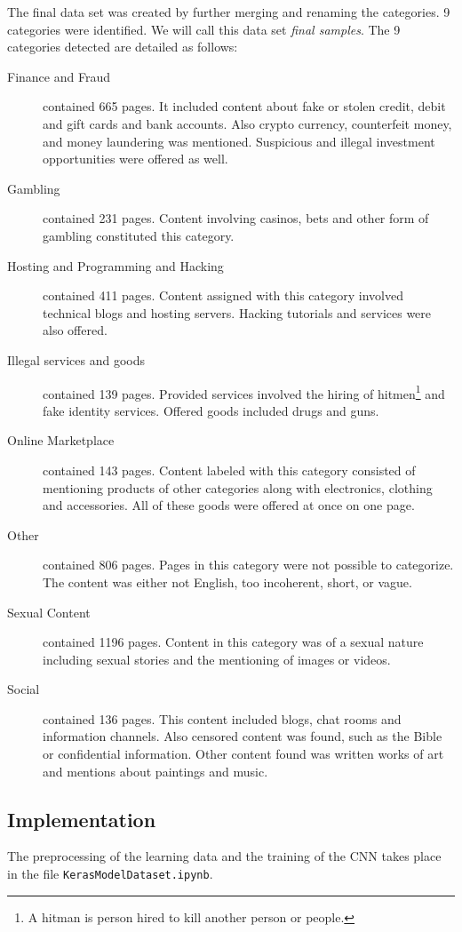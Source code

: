 The final data set was created by further merging and renaming the categories. 9 categories were identified. We will call this data set \textit{final samples}. The 9 categories detected are detailed as follows:
 \label{classificationCategories}
\begin {description}
	\item[Finance and Fraud] contained 665 pages. It included content about fake or stolen credit, debit and gift cards and bank accounts. Also crypto currency, counterfeit money, and money laundering was mentioned. Suspicious and illegal investment opportunities were offered as well.
	\item[Gambling] contained 231 pages. Content involving casinos, bets and other form of gambling constituted this category.
	\item[Hosting and Programming and Hacking] contained 411 pages. Content assigned with this category involved technical blogs and hosting servers. Hacking tutorials and services were also offered.
	\item[Illegal services and goods] contained 139 pages. Provided services involved the hiring of hitmen\footnote{A hitman is person hired to kill another person or people.} and fake identity services. Offered goods included drugs and guns.
	\item[Online Marketplace] contained 143 pages. Content labeled with this category consisted of mentioning products of other categories along with electronics, clothing and accessories. All of these goods were offered at once on one page.
	\item[Other] contained 806 pages. Pages in this category were not possible to categorize. The content was either not English, too incoherent, short, or vague. 
	\item[Sexual Content] contained 1196 pages. Content in this category was of a sexual nature including sexual stories and the mentioning of images or videos.
	\item[Social] contained 136 pages. This content included blogs, chat rooms and information channels. Also censored content was found, such as the Bible or confidential information. Other content found was written works of art and mentions about paintings and music. 
\end{description}

\subsection{Implementation} \label{ClassificationImplementation}
The preprocessing of the learning data and the training of the CNN takes place in the file \texttt{KerasModelDataset.ipynb}. 

